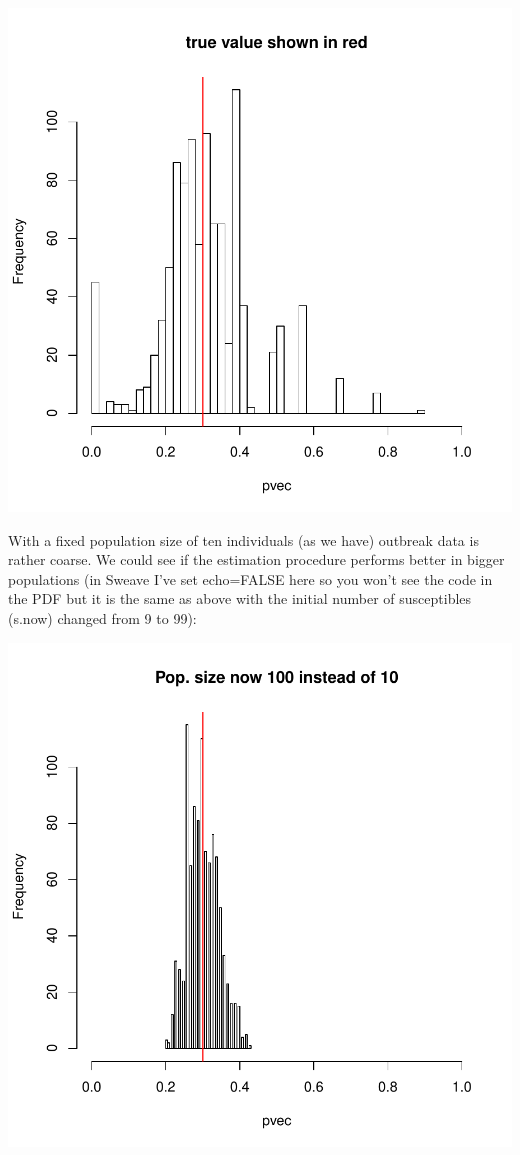 \documentclass{article}
\begin{document}
\includegraphics{chn_binom-010}

With a fixed population size of ten individuals (as we have) outbreak data is rather coarse. We could see if the estimation procedure performs better in bigger populations (in Sweave I've set echo=FALSE here so you won't see the code in the PDF but it is the same as above with the initial number of susceptibles (s.now) changed from 9 to 99):

\includegraphics{chn_binom-011}
\end{document}
